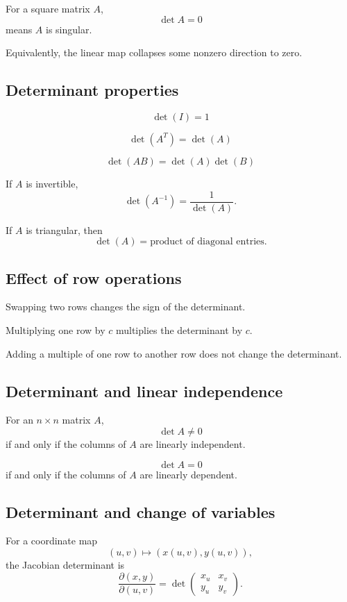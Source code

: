 For a square matrix \(A\),
\[
\boxed{
    \det A=0
}
\]
means \(A\) is singular.

Equivalently, the linear map collapses some nonzero direction to zero.

\subsection*{Determinant properties}

\[
\boxed{
    \det(I)=1
}
\]

\[
\boxed{
    \det(A^T)=\det(A)
}
\]

\[
\boxed{
    \det(AB)=\det(A)\det(B)
}
\]

If \(A\) is invertible,
\[
\boxed{
    \det(A^{-1})=\frac1{\det(A)}.
}
\]

If \(A\) is triangular, then
\[
\boxed{
    \det(A)=\text{product of diagonal entries}.
}
\]

\subsection*{Effect of row operations}

Swapping two rows changes the sign of the determinant.

Multiplying one row by \(c\) multiplies the determinant by \(c\).

Adding a multiple of one row to another row does not change the determinant.

\subsection*{Determinant and linear independence}

For an \(n\times n\) matrix \(A\),
\[
\boxed{
    \det A\ne0
}
\]
if and only if the columns of \(A\) are linearly independent.

\[
\boxed{
    \det A=0
}
\]
if and only if the columns of \(A\) are linearly dependent.

\subsection*{Determinant and change of variables}

For a coordinate map
\[
    (u,v)\mapsto (x(u,v),y(u,v)),
\]
the Jacobian determinant is
\[
\boxed{
    \frac{\partial(x,y)}{\partial(u,v)}
    =
    \det
    \begin{pmatrix}
    x_u & x_v\\
    y_u & y_v
    \end{pmatrix}.
}
\]

